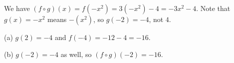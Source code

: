 We have $(f\circ g)(x)=f(-x^2)=3(-x^2)-4=-3x^2-4$. Note that $g(x)=-x^2$ means $-(x^2)$, so $g(-2)=-4$, not $4$.

(a) $g(2)=-4$ and $f(-4)=-12-4=\boxed{-16}$.

(b) $g(-2)=-4$ as well, so $(f\circ g)(-2)=\boxed{-16}$.
